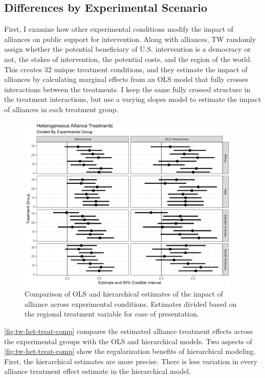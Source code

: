 \documentclass[12pt]{article}
\begin{document}
\subsection{Differences by Experimental Scenario}


First, I examine how other experimental conditions modify the impact of alliances on public support for intervention.
Along with alliances, TW randomly assign whether the potential beneficiary of U.S. intervention is a democracy or not, the stakes of intervention, the potential costs, and the region of the world. 
This creates 32 unique treatment conditions, and they estimate the impact of alliances by calculating marginal effects from an OLS model that fully crosses interactions between the treatments. 
I keep the same fully crossed structure in the treatment interactions, but use a varying slopes model to estimate the impact of alliances in each treatment group.

\begin{figure}[htpb]
	\centering
		\includegraphics[width=0.95\textwidth]{../figures/tw-het-treat-comp2.png}
	\caption{Comparison of OLS and hierarchical estimates of the impact of alliance across experimental conditions. Estimates divided based on the regional treatment variable for ease of presentation.}
	\label{fig:tw-het-treat-comp}
\end{figure}


\autoref{fig:tw-het-treat-comp} compares the estimated alliance treatment effects across the experimental groups with the OLS and hierarchical models.
Two aspects of \autoref{fig:tw-het-treat-comp} show the regularization benefits of hierarchical modeling.
First, the hierarchical estimates are more precise. 
There is less variation in every alliance treatment effect estimate in the hierarchical model. 
\end{document}
